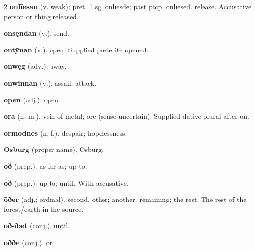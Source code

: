 \begin{multicols*}{2}
\textbf{onlīesan} (v. weak); pret. 1 sg. onlīesde; past ptcp. onlīesed. release. Accusative person or thing released.\par
\textbf{onsęndan} (v.). send.\par
\textbf{ontȳnan} (v.). open. Supplied preterite opened.\par
\textbf{onwęg} (adv.). away.\par
\textbf{onwinnan} (v.). assail; attack.\par
\textbf{open} (adj.). open.\par
\textbf{ōra} (n. m.). vein of metal; ore (sense uncertain). Supplied dative plural after on.\par
\textbf{ōrmōdnes} (n. f.). despair; hopelessness.\par
\textbf{Osburg} (proper name). Osburg.\par
\textbf{ōð} (prep.). as far as; up to.\par
\textbf{oð} (prep.). up to; until. With accusative.\par
\textbf{ōðer} (adj.; ordinal). second. other; another. remaining; the rest. The rest of the forest/earth in the source.\par
\textbf{oð-ðæt} (conj.). until.\par
\textbf{oððe} (conj.). or.\par

\end{multicols*}
